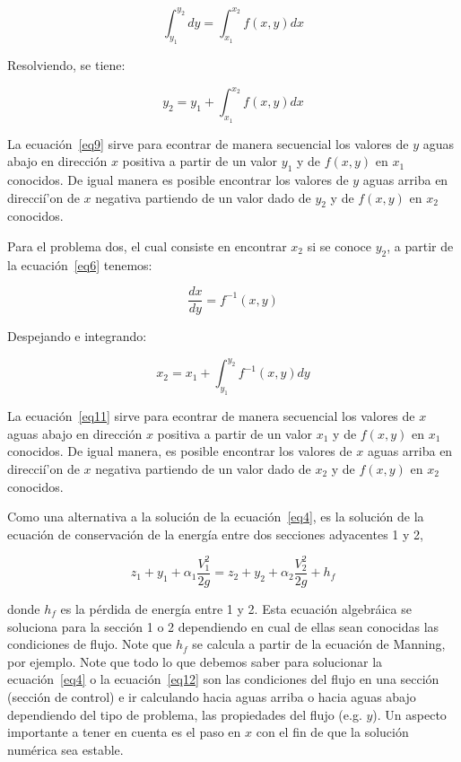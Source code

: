 \documentclass[11pt, oneside]{article}
\begin{document}
\begin{equation}
    \int_{y_1}^{y_2} dy = \int_{x_1}^{x_2} f(x,y) dx
\label{eq8}
\end{equation}

Resolviendo, se tiene:

\begin{equation}
    y_2 = y_1 +  \int_{x_1}^{x_2} f(x,y) dx
\label{eq9}
\end{equation}

La ecuaci\'on~\ref{eq9} sirve para econtrar de manera secuencial los valores de $y$ aguas abajo en direcci\'on $x$ positiva a partir de un valor $y_1$ y de $f(x,y)$ en $x_1$ conocidos. De igual manera es posible encontrar los valores de $y$ aguas arriba en direcci\'i'on de $x$ negativa partiendo de un valor dado de $y_2$ y de $f(x,y)$ en $x_2$ conocidos.

Para el problema dos, el cual consiste en encontrar $x_2$ si se conoce $y_2$, a partir de la ecuaci\'on~\ref{eq6} tenemos:

\begin{equation}
    \frac{dx}{dy} = f^{-1}(x,y)
\label{eq10}
\end{equation}

Despejando e integrando:

\begin{equation}
    x_2 = x_1 + \int_{y_1}^{y_2}  f^{-1}(x,y) dy
\label{eq11}
\end{equation}

La ecuaci\'on~\ref{eq11} sirve para econtrar de manera secuencial los valores de $x$ aguas abajo en direcci\'on $x$ positiva a partir de un valor $x_1$ y de $f(x,y)$ en $x_1$ conocidos. De igual manera, es posible encontrar los valores de $x$ aguas arriba en direcci\'i'on de $x$ negativa partiendo de un valor dado de $x_2$ y de $f(x,y)$ en $x_2$ conocidos.

Como una alternativa a la soluci\'on de la ecuaci\'on~\ref{eq4}, es la soluci\'on de la ecuaci\'on de conservaci\'on de la energ\'ia entre dos secciones adyacentes 1 y 2,

\begin{equation}
    z_1 + y_1 + \alpha_1 \frac{V_1^2}{2g} = z_2 + y_2 + \alpha_2 \frac{V_2^2}{2g}  + h_f
\label{eq12}
\end{equation}

donde $h_f$ es la p\'erdida de energ\'ia entre 1 y 2. Esta ecuaci\'on algebr\'aica se soluciona para la secci\'on 1 o 2 dependiendo en cual de ellas sean conocidas las condiciones de flujo. Note que $h_f$ se calcula a partir de la ecuaci\'on de Manning, por ejemplo. Note que todo lo que debemos saber para solucionar la ecuaci\'on~\ref{eq4} o la ecuaci\'on~\ref{eq12} son las condiciones del flujo  en una secci\'on (secci\'on de control) e ir calculando hacia aguas arriba o hacia aguas abajo dependiendo del tipo de problema, las propiedades del flujo (e.g. $y$). Un aspecto importante a tener en cuenta es el  paso en $x$ con el fin de que la soluci\'on num\'erica sea estable.  
\end{document}
